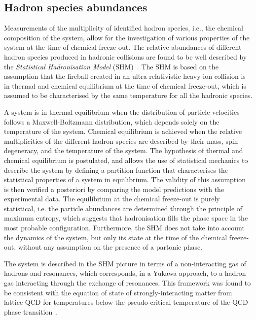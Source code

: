 \subsection{Hadron species abundances}\label{subsec:SHM}
Measurements of the multiplicity of identified hadron species, i.e., the chemical composition of the system, allow for the investigation of various properties of the system at the time of chemical freeze-out. The relative abundances of different hadron species produced in hadronic collisions are found to be well described by the \emph{Statistical Hadronisation Model} (SHM)~\cite{Braun-Munzinger:2003pwq}. The SHM is based on the assumption that the fireball created in an ultra-relativistic heavy-ion collision is in thermal and chemical equilibrium at the time of chemical freeze-out, which is assumed to be characterised by the same temperature for all the hadronic species.

A system is in thermal equilibrium when the distribution of particle velocities follows a Maxwell-Boltzmann distribution, which depends solely on the temperature of the system. Chemical equilibrium is achieved when the relative multiplicities of the different hadron species are described by their mass, spin degeneracy, and the temperature of the system. The hypothesis of thermal and chemical equilibrium is postulated, and allows the use of statistical mechanics to describe the system by defining a partition function that characterises the statistical properties of a system in equilibrium. The validity of this assumption is then verified a posteriori by comparing the model predictions with the experimental data. The equilibrium at the chemical freeze-out is purely statistical, i.e. the particle abundances are determined through the principle of maximum entropy, which suggests that hadronisation fills the phase space in the most probable configuration. Furthermore, the SHM does not take into account the dynamics of the system, but only its state at the time of the chemical freeze-out, without any assumption on the presence of a partonic phase. 

The system is described in the SHM picture in terms of a non-interacting gas of hadrons and resonances, which corresponds, in a Yukawa approach, to a hadron gas interacting through the exchange of resonances. This framework was found to be consistent with the equation of state of strongly-interacting matter from lattice QCD for temperatures below the pseudo-critical temperature of the QCD phase transition~\cite{HotQCD:2014kol}. 


